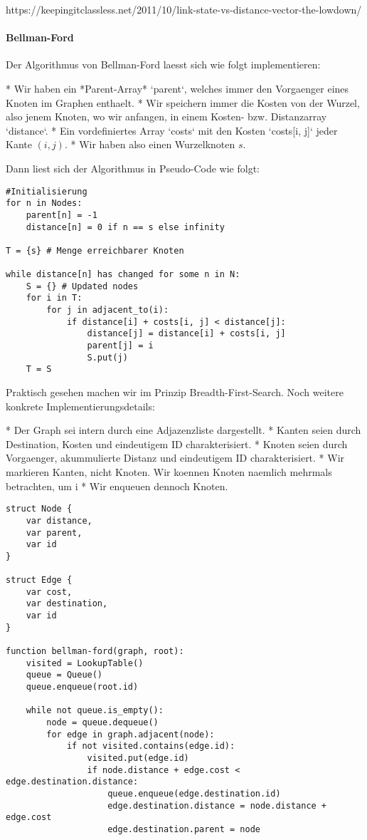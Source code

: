 https://keepingitclassless.net/2011/10/link-state-vs-distance-vector-the-lowdown/

\paragraph{Bellman-Ford} 

Der Algorithmus von Bellman-Ford laesst sich wie folgt implementieren:

* Wir haben ein *Parent-Array* `parent`, welches immer den Vorgaenger eines Knoten im
  Graphen enthaelt.
* Wir speichern immer die Kosten von der Wurzel, also jenem Knoten, wo wir
  anfangen, in einem Kosten- bzw. Distanzarray `distance`.
* Ein vordefiniertes Array `costs` mit den Kosten `costs[i, j]` jeder Kante $(i, j)$.
* Wir haben also einen Wurzelknoten $s$.

Dann liest sich der Algorithmus in Pseudo-Code wie folgt:

\begin{verbatim}
#Initialisierung
for n in Nodes:
	parent[n] = -1
	distance[n] = 0 if n == s else infinity

T = {s} # Menge erreichbarer Knoten

while distance[n] has changed for some n in N:
	S = {} # Updated nodes
	for i in T:
		for j in adjacent_to(i):
			if distance[i] + costs[i, j] < distance[j]:
				distance[j] = distance[i] + costs[i, j]
				parent[j] = i
				S.put(j)
	T = S

\end{verbatim}

Praktisch gesehen machen wir im Prinzip Breadth-First-Search. Noch weitere
konkrete Implementierungsdetails:

* Der Graph sei intern durch eine Adjazenzliste dargestellt.
* Kanten seien durch Destination, Kosten und eindeutigem ID charakterisiert.
* Knoten seien durch Vorgaenger, akummulierte Distanz und eindeutigem ID
  charakterisiert.
* Wir markieren Kanten, nicht Knoten. Wir koennen Knoten naemlich mehrmals
  betrachten, um i
* Wir enqueuen dennoch Knoten.

\begin{verbatim}
struct Node {
	var distance,
	var parent,
	var id
}

struct Edge {
	var cost,
	var destination,
	var id
}

function bellman-ford(graph, root):
	visited = LookupTable()
	queue = Queue()
    queue.enqueue(root.id)

	while not queue.is_empty():
		node = queue.dequeue()
		for edge in graph.adjacent(node):
			if not visited.contains(edge.id):
				visited.put(edge.id)
				if node.distance + edge.cost < edge.destination.distance:
            		queue.enqueue(edge.destination.id)
					edge.destination.distance = node.distance + edge.cost
					edge.destination.parent = node
\end{verbatim}


